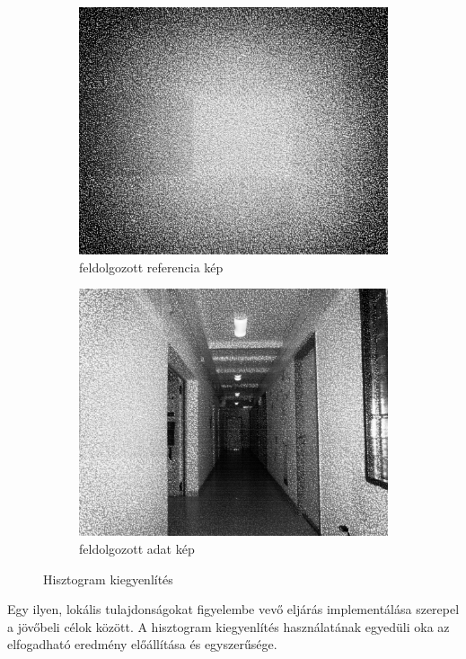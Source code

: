 \begin{figure}[ht!]
	\begin{subfigure}{.5\textwidth}
	  \centering
	  \includegraphics[width=0.9\linewidth]{figures/eq_ref.png}
	  \caption{feldolgozott referencia kép}
	  \label{fig:eqRef}
	\end{subfigure}
	\begin{subfigure}{.5\textwidth}
	  \centering
	  \includegraphics[width=0.9\linewidth]{figures/eq_data.png}
	  \caption{feldolgozott adat kép}
	  \label{fig:eqData}
	\end{subfigure}
	\caption{Hisztogram kiegyenlítés}
	\label{fig:eqPreproc}
\end{figure}

Egy ilyen, lokális tulajdonságokat figyelembe vevő eljárás implementálása szerepel a jövőbeli célok között.
A hisztogram kiegyenlítés használatának egyedüli oka az elfogadható eredmény előállítása és egyszerűsége.

